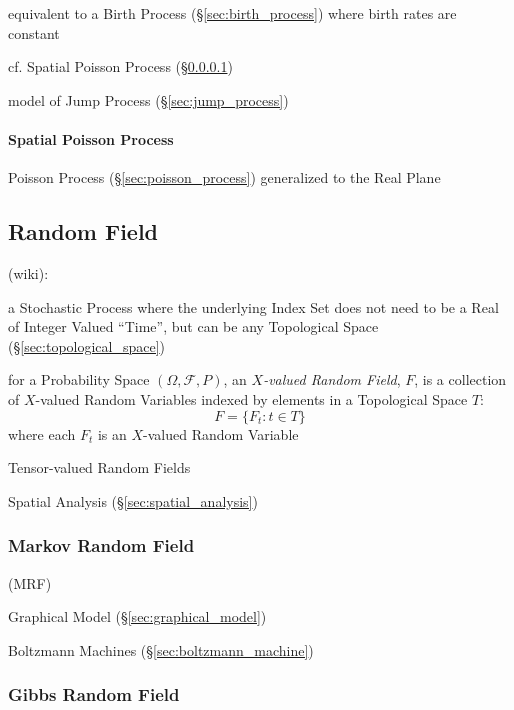 equivalent to a Birth Process (\S\ref{sec:birth_process}) where birth rates are
constant

cf. Spatial Poisson Process (\S\ref{sec:spatial_poisson})

model of Jump Process (\S\ref{sec:jump_process})



\paragraph{Spatial Poisson Process}\label{sec:spatial_poisson}\hfill

Poisson Process (\S\ref{sec:poisson_process}) generalized to the Real Plane



\subsection{Random Field}\label{sec:random_field}

(wiki):

a Stochastic Process where the underlying Index Set does not need to be a Real
of Integer Valued ``Time'', but can be any Topological Space
(\S\ref{sec:topological_space})

for a Probability Space $(\Omega, \mathcal{F}, P)$, an \emph{$X$-valued
  Random Field}, $F$, is a collection of $X$-valued Random Variables indexed by
elements in a Topological Space $T$:
\[
  F = \{ F_t : t \in T \}
\]
where each $F_t$ is an $X$-valued Random Variable

Tensor-valued Random Fields

\fist Spatial Analysis (\S\ref{sec:spatial_analysis})



\subsubsection{Markov Random Field}\label{sec:markov_random_field}

(MRF)

Graphical Model (\S\ref{sec:graphical_model})

Boltzmann Machines (\S\ref{sec:boltzmann_machine})



\subsubsection{Gibbs Random Field}\label{sec:gibbs_random_field}

